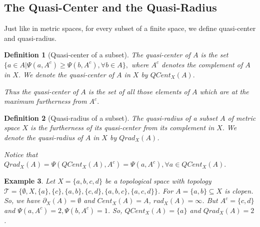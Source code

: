 \documentclass[12pt]{amsart}
\newtheorem{definition}{Definition}[section]
\newtheorem{example}[definition]{Example}
\begin{document}

\subsection{\textbf{The Quasi-Center and the Quasi-Radius}}

Just like in metric spaces, for every subset of a finite space, we define quasi-center and quasi-radius.


\begin{definition}[Quasi-center of a subset]
	The quasi-center of $A$ is the set $\{a\in A|\Psi(a,A^c)\geq \Psi(b,A^c),\forall b\in A\},$ where $A^c$ denotes the complement of $A$ in $X$. We denote the quasi-center of $A$ in $X$ by $QCent_{X}(A).$\par
	Thus the quasi-center of $A$ is the set of all those elements of $A$ which are at the maximum furtherness from $A^c.$
\end{definition}

\begin{definition}[Quasi-radius of a subset]
	The quasi-radius of a subset $A$ of metric space $X$ is the furtherness of its quasi-center from its complement in $X.$ We denote the quasi-radius of $A$ in $X$ by $Qrad_{X}(A)$.\par
	Notice that $Qrad_{X}(A)=\Psi(QCent_{X}(A),A^c)=\Psi(a,A^c),\forall a\in QCent_{X}(A).$
\end{definition}


\begin{example}{\normalfont
		Let $X=\{a,b,c,d\}$ be a topological space with topology $\mathcal{T}=\{\emptyset,X,\{a\},\{c\},\{a,b\},\{c,d\},\{a,b,c\},\{a,c,d\}\}$. For $A=\{a,b\}\subseteq X$ is clopen. So, we have $\partial_{X}(A)=\emptyset$ and $Cent_X(A)=A$, $rad_{X}(A)=\infty$. But $A^c=\{c,d\}$ and $\Psi(a,A^c)=2, \Psi(b,A^c)=1$. So, $QCent_{X}(A)=\{a\}$ and $Qrad_{X}(A)=2$.
	}
\end{example}

\end{document}
